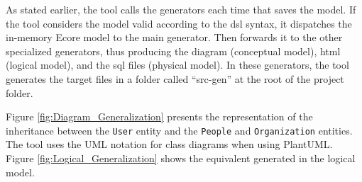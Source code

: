 As stated earlier, the tool calls the generators each time that saves the model.
If the tool considers the model valid according to the \ac{dsl} syntax, it dispatches the in-memory Ecore model to the main generator. Then forwards it to the other specialized generators, thus producing the diagram (conceptual model), \ac{html} (logical model), and the \ac{sql} files (physical model).
In these generators, the tool generates the target files in a folder called ``src-gen'' at the root of the project folder.


Figure \ref{fig:Diagram_Generalization} presents the representation of the inheritance between the \texttt{User} entity and the \texttt{People} and \texttt{Organization} entities.
The tool uses the UML notation for class diagrams when using PlantUML.
Figure \ref{fig:Logical_Generalization} shows the equivalent generated in the logical model.

